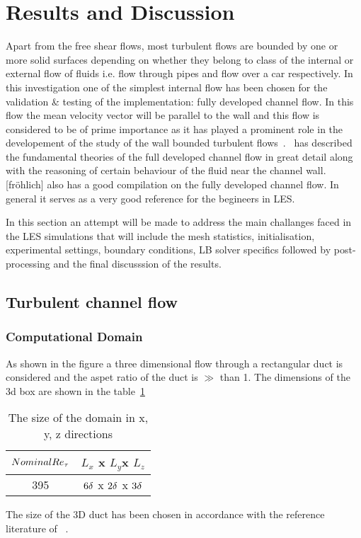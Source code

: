 \newpage

\section{Results and Discussion}

Apart from the free shear flows, most turbulent flows are bounded by one or more solid surfaces depending on whether they belong to class of the internal or external flow of fluids i.e. flow through pipes and flow over a car respectively.  In this investigation one of the simplest internal flow has been chosen for the validation \& testing of the implementation: fully developed channel flow. In this flow the mean velocity vector will be parallel to the wall and this flow is considered to be of prime importance as it has played a prominent role in the developement of the study of the wall bounded turbulent flows~\cite{pope:book}.~\cite{pope:book} has described the fundamental theories of the full developed channel flow in great detail along with the reasoning of certain behaviour of the fluid near the channel wall. [fröhlich] also has a good compilation on the fully developed channel flow. In general it serves as a very good reference for the begineers in LES.

In this section an attempt will be made to address the main challanges faced in the LES simulations that will include the mesh statistics, initialisation, experimental settings, boundary conditions, LB solver specifics followed by post-processing and the final discusssion of the results. 

\subsection{Turbulent channel flow}
\subsubsection{Computational Domain}

As shown in the figure a three dimensional flow through a rectangular duct is considered and the aspet ratio of the duct is $\gg$ than 1.
The dimensions of the 3d box are shown in the table~\ref{Computational Domain}

\begin{table}[]
\centering
\begin{tabular}{|c|c|}
\hline
$Nominal Re_{\tau}$ & $L_x$ x $L_y $x $L_z$ \\
\hline
%
395   &  $6\delta$ x $2\delta$ x $3\delta$  \\
\hline
\end{tabular}
\caption{The size of the domain in x, y, z directions}
\label{Computational Domain}
\end{table}

The size of the 3D duct has been chosen in accordance with the reference literature of ~\cite{moser:kim:mansour:99}.

